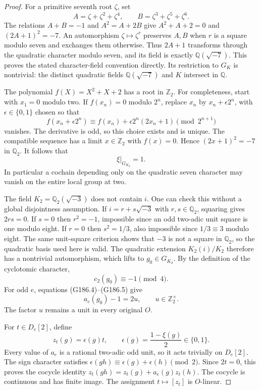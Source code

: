 \begin{proof}
For a primitive seventh root $\zeta$, set
\[
 A=\zeta+\zeta^2+\zeta^4,\qquad
 B=\zeta^3+\zeta^5+\zeta^6.
\]
The relations $A+B=-1$ and $A^2=A+2B$ give
$A^2+A+2=0$ and $(2A+1)^2=-7$.
An automorphism $\zeta\mapsto\zeta^r$ preserves $A,B$ when
$r$ is a square modulo seven and exchanges them otherwise.
Thus $2A+1$ transforms through the quadratic character modulo
seven, and its field is exactly $\mathbb Q(\sqrt{-7})$.
This proves the stated character-field convention directly.
Its restriction to $G_K$ is nontrivial: the distinct quadratic
fields $\mathbb Q(\sqrt{-7})$ and $K$ intersect in $\mathbb Q$.

The polynomial $f(X)=X^2+X+2$ has a root in $\mathbb Z_2$.
For completeness, start with $x_1=0$ modulo two.
If $f(x_n)=0$ modulo $2^n$, replace $x_n$ by
$x_n+\epsilon2^n$, with $\epsilon\in\{0,1\}$ chosen so that
\[
 f(x_n+\epsilon2^n)
       \equiv f(x_n)+\epsilon2^n(2x_n+1)\pmod{2^{n+1}}
\]
vanishes.  The derivative is odd, so this choice exists and
is unique.  The compatible sequence has a limit $x\in\mathbb Z_2$
with $f(x)=0$.  Hence $(2x+1)^2=-7$ in $\mathbb Q_2$.
It follows that
\[
                     \xi|_{G_{K_2}}=1.
 \tag{G186.4}
\]
In particular a cochain depending only on the quadratic
seven character may vanish on the entire local group at two.

The field $K_2=\mathbb Q_2(\sqrt{-3})$ does not contain $i$.
One can check this without a global disjointness assumption.
If $i=r+s\sqrt{-3}$ with $r,s\in\mathbb Q_2$, squaring gives
$2rs=0$.  If $s=0$ then $r^2=-1$, impossible since an odd
two-adic unit square is one modulo eight.
If $r=0$ then $s^2=1/3$, also impossible since $1/3\equiv3$
modulo eight.  The same unit-square criterion shows that
$-3$ is not a square in $\mathbb Q_2$, so the quadratic basis
used here is valid.
The quadratic extension $K_2(i)/K_2$ therefore has a nontrivial
automorphism, which lifts to $g_0\in G_{K_2}$.
By the definition of the cyclotomic character,
\[
              c_2(g_0)\equiv-1\pmod4.
 \tag{G186.5}
\]
For odd $e$, equations (G186.4)--(G186.5) give
\[
                  a_e(g_0)-1=2u,
                        \qquad u\in\mathbb Z_2^\times.
 \tag{G186.6}
\]
The factor $u$ remains a unit in every original $O$.

For $t\in D_e[2]$, define
\[
 z_t(g)=\epsilon(g)t,
          \qquad \epsilon(g)=\frac{1-\xi(g)}2\in\{0,1\}.
 \tag{G186.7}
\]
Every value of $a_e$ is a rational two-adic odd unit, so it
acts trivially on $D_e[2]$.
The sign character satisfies
$\epsilon(gh)\equiv\epsilon(g)+\epsilon(h)\pmod2$.
Since $2t=0$, this proves the cocycle identity
$z_t(gh)=z_t(g)+a_e(g)z_t(h)$.
The cocycle is continuous and has finite image.
The assignment $t\mapsto[z_t]$ is $O$-linear.


\end{proof}
